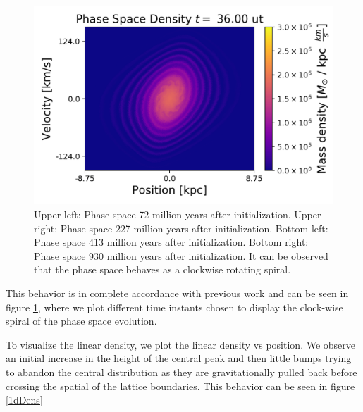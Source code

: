\begin{figure}[h!]
    \includegraphics[scale=0.45]{imag/gauss90.png}
    \caption{Upper left: Phase space 72 million years after initialization. Upper right: Phase space 227 million years after initialization. Bottom left: Phase space 413 million years after initialization. Bottom right: Phase space 930 million years after initialization. It can be observed that the phase space behaves as a clockwise rotating spiral.}
    \label{1dphase}
\end{figure}


This behavior is in complete accordance with previous work and can be seen in figure \ref{1dphase}, where we plot different time instants chosen to display the clock-wise spiral of the phase space evolution.

To visualize the linear density, we plot the linear density vs position. We observe an initial increase in the height of the central peak and then little bumps trying to abandon the central distribution as they are gravitationally pulled back before crossing the spatial of the lattice boundaries. This behavior can be seen in figure \ref{1dDens}




